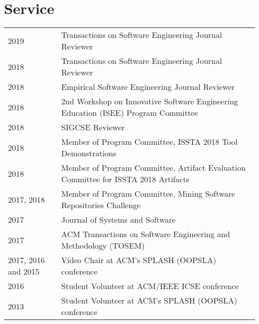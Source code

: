 \documentclass[10pt]{article}
\begin{document}
%
\vspace{15pt}
\section{Service}

\noindent\begin{tabular}{p{2.5cm}p{10.5cm}}
2019 & Transactions on Software Engineering Journal Reviewer\\
2018 & Transactions on Software Engineering Journal Reviewer\\
2018 & Empirical Software Engineering Journal Reviewer\\
2018 & 2nd Workshop on Innovative Software Engineering Education (ISEE) Program Committee \\
2018 & SIGCSE Reviewer \\
2018 & Member of Program Committee, ISSTA 2018 Tool Demonstrations \\
2018 & Member of Program Committee, Artifact Evaluation Committee for ISSTA 2018 Artifacts \\
2017, 2018 & Member of Program Committee, Mining Software Repositories Challenge \\
2017 & Journal of Systems and Software \\
2017 & ACM Transactions on Software Engineering and Methodology (TOSEM) \\

2017, 2016 and 2015 &Video Chair at ACM's SPLASH (OOPSLA) conference\\
2016 &Student Volunteer at ACM/IEEE ICSE conference\\
2013 &Student Volunteer at ACM's SPLASH (OOPSLA) conference\\
\end{tabular}\\

\vspace{10pt}
%
%
%
\end{document}
